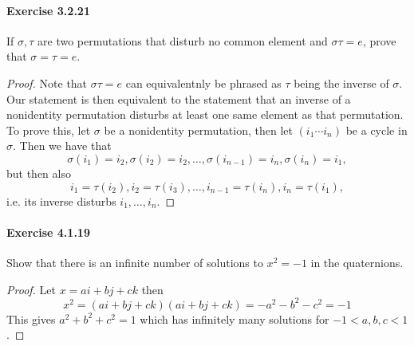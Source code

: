 \documentclass{article}
\begin{document}
\paragraph{Exercise 3.2.21} If $\sigma, \tau$ are two permutations that disturb no common element and $\sigma \tau = e$, prove that $\sigma = \tau = e$.
\begin{proof}
    Note that $\sigma \tau=e$ can equivalentnly be phrased as $\tau$ being the inverse of $\sigma$. Our statement is then equivalent to the statement that an inverse of a nonidentity permutation disturbs at least one same element as that permutation. To prove this, let $\sigma$ be a nonidentity permutation, then let $\left(i_1 \cdots i_n\right)$ be a cycle in $\sigma$. Then we have that
$$
\sigma\left(i_1\right)=i_2, \sigma\left(i_2\right)=i_2, \ldots, \sigma\left(i_{n-1}\right)=i_n, \sigma\left(i_n\right)=i_1,
$$
but then also
$$
i_1=\tau\left(i_2\right), i_2=\tau\left(i_3\right), \ldots, i_{n-1}=\tau\left(i_n\right), i_n=\tau\left(i_1\right),
$$
i.e. its inverse disturbs $i_1, \ldots, i_n$.
\end{proof}



\paragraph{Exercise 4.1.19} Show that there is an infinite number of solutions to $x^2 = -1$ in the quaternions.
\begin{proof}
Let $x=a i+b j+c k$ then
$$
x^2=(a i+b j+c k)(a i+b j+c k)=-a^2-b^2-c^2=-1
$$
This gives $a^2+b^2+c^2=1$ which has infinitely many solutions for $-1<a, b, c<1$.
\end{proof}
\end{document}
